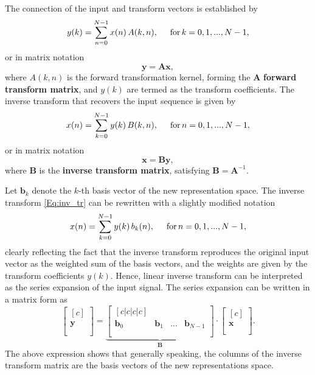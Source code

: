The connection of the input and transform vectors is established by 
\begin{equation}
y(k) = \sum_{n=0}^{N-1} x(n) \, A(k,n), \hspace{5mm} \text{for} \, k = 0,1,...,N-1,
\end{equation}
or in matrix notation
\begin{equation}
\mathbf{y} = \mathbf{A} \mathbf{x},
\end{equation}
where $A(k,n)$ is the forward transformation kernel, forming the $\mathbf{A}$ \textbf{forward transform matrix}, and $y(k)$ are termed as the transform coefficients. 
The inverse transform that recovers the input sequence is given by
\begin{equation}
x(n) = \sum_{k=0}^{N-1} y(k) \, B(k,n), \hspace{5mm} \text{for} \, n = 0,1,...,N-1,
\label{Eq:inv_tr}
\end{equation}
or in matrix notation
\begin{equation}
\mathbf{x} = \mathbf{B} \mathbf{y},
\end{equation}
where $\mathbf{B}$ is the \textbf{inverse transform matrix}, satisfying $\mathbf{B} = \mathbf{A}^{-1}$.

Let $\mathbf{b}_k$ denote the $k$-th basis vector of the new representation space.
The inverse transform \eqref{Eq:inv_tr} can be rewritten with a slightly modified notation
\begin{equation}
x(n) = \sum_{k=0}^{N-1} y(k) \, b_k (n), \hspace{5mm} \text{for} \, n = 0,1,...,N-1,
\end{equation}
clearly reflecting the fact that the inverse transform reproduces the original input vector as the weighted sum of the basis vectors, and the weights are given by the transform coefficients $y(k)$.
Hence, linear inverse transform can be interpreted as the series expansion of the input signal.
The series expansion can be written in a matrix form as
\begin{equation}
\begin{bmatrix}[c]
      \\
   \mathbf{y}  \\
     \\
\end{bmatrix}
= 
\underbrace{\begin{bmatrix}[c|c|c|c]
      &   &  & \\
   \mathbf{b}_0 & \mathbf{b}_1 & ... & \mathbf{b}_{N-1} \\
     &   &   & \\
\end{bmatrix}}_{\mathbf{B}} \cdot 
\begin{bmatrix}[c]
      \\
   \mathbf{x}  \\
     \\
\end{bmatrix}.
\end{equation}
The above expression shows that generally speaking, the columns of the inverse transform matrix are the basis vectors of the new representations space.

